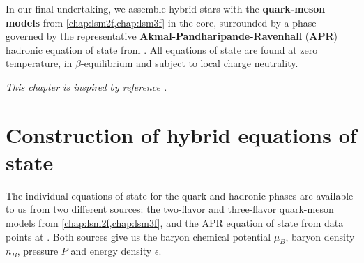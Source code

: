 In our final undertaking,
we assemble hybrid stars with the \textbf{quark-meson models} from \cref{chap:lsm2f,chap:lsm3f} in the core,
surrounded by a phase governed by the representative \textbf{Akmal-Pandharipande-Ravenhall} (\textbf{APR}) hadronic equation of state from \cite{ref:apr}.
All equations of state are found at zero temperature, in $\beta$-equilibrium and subject to local charge neutrality.

\textit{This chapter is inspired by reference \cite{ref:quark_star_review}.}

\section{Construction of hybrid equations of state}
\label{sec:hybrid:construction}

The individual equations of state for the quark and hadronic phases are available to us from two different sources:
the two-flavor and three-flavor quark-meson models from \cref{chap:lsm2f,chap:lsm3f},
and the APR equation of state from data points at \cite{ref:apr_data}.
Both sources give us the baryon chemical potential $\mu_B$, baryon density $n_B$, pressure $P$ and energy density $\epsilon$.

